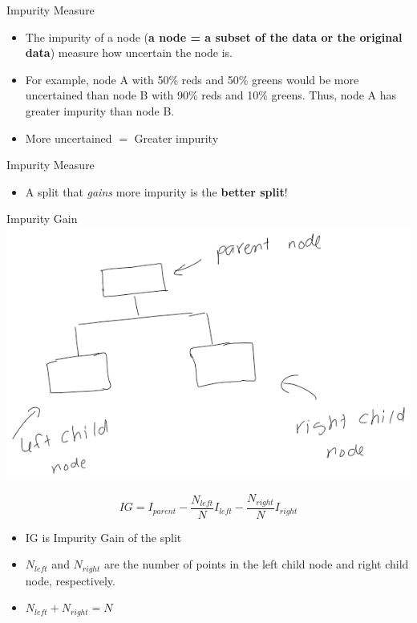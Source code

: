 \documentclass[
  ignorenonframetext,
]{beamer}
\providecommand{\tightlist}{%
  \setlength{\itemsep}{0pt}\setlength{\parskip}{0pt}}
\begin{document}
\begin{frame}{Impurity Measure}
\label{impurity-measure}
\begin{itemize}
\tightlist
\item
  The impurity of a node (\textbf{a node = a subset of the data or the
  original data}) measure how uncertain the node is.\\
\item
  For example, node A with 50\% reds and 50\% greens would be more
  uncertained than node B with 90\% reds and 10\% greens. Thus, node A
  has greater impurity than node B.
\item
  More uncertained \(=\) Greater impurity
\end{itemize}
\end{frame}

\begin{frame}{Impurity Measure}
\label{impurity-measure-1}
\begin{itemize}
\tightlist
\item
  A split that \emph{gains} more impurity is the \textbf{better split}!
\end{itemize}
\end{frame}

\begin{frame}{Impurity Gain}
\label{impurity-gain}
\includegraphics{images/parent_child.png}

\[
IG = I_{parent} - \frac{N_{left}}{N}I_{left}-\frac{N_{right}}{N}I_{right}
\]

\begin{itemize}
\tightlist
\item
  IG is Impurity Gain of the split
\item
  \(N_{left}\) and \(N_{right}\) are the number of points in the left
  child node and right child node, respectively.
\item
  \(N_{left}+N_{right}=N\)
\end{itemize}
\end{frame}
\end{document}
